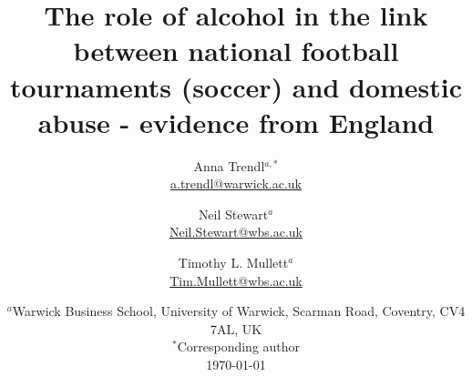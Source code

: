 \documentclass[12pt, a4paper]{article}
\title{}
\author{}
\date{}
\begin{document}
\title{The role of alcohol in the link between national football tournaments (soccer) and domestic abuse - evidence from England}

\author{Anna Trendl$^{a,*}$ \\ \href{mailto:a.trendl@warwick.ac.uk}{a.trendl@warwick.ac.uk}\\
 \and Neil Stewart$^a$ \\
 \href{mailto:neil.stewart@wbs.ac.uk}{Neil.Stewart@wbs.ac.uk}
 \\
 \and Timothy L. Mullett$^a$ \\
 \href{mailto:Tim.Mullett@wbs.ac.uk}{Tim.Mullett@wbs.ac.uk}
 \\}

\date{
    $^a$Warwick Business School, University of Warwick, Scarman Road, Coventry, CV4 7AL, UK\\
    $^*$Corresponding author\\[2ex]%
    \today
}
\end{document}
